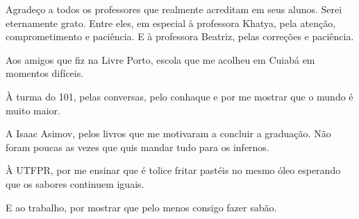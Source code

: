\begin{agradecimentos}

Agradeço a todos os professores que realmente acreditam em seus alunos. Serei eternamente grato. 
Entre eles, em especial à professora Khatya, pela atenção, comprometimento e paciência. E à 
professora Beatriz, pelas correções e paciência. 

Aos amigos que fiz na Livre Porto, escola que me acolheu em Cuiabá em momentos difíceis. 

À turma do 101, pelas conversas, pelo conhaque e por me mostrar que o mundo é muito maior.

A Isaac Asimov, pelos livros que me motivaram a concluir a graduação. Não foram poucas 
as vezes que quis mandar tudo para os infernos.

À UTFPR, por me ensinar que é tolice fritar pastéis no mesmo óleo esperando que os 
sabores continuem iguais.

E ao trabalho, por mostrar que pelo menos consigo fazer sabão.

\end{agradecimentos}